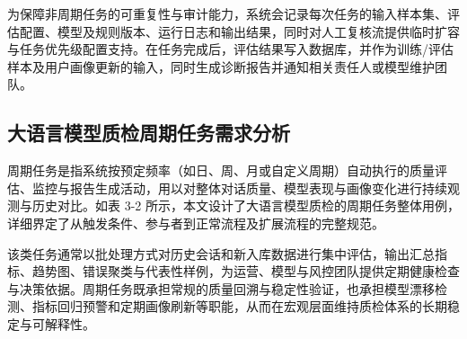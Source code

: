 为保障非周期任务的可重复性与审计能力，系统会记录每次任务的输入样本集、评估配置、模型及规则版本、运行日志和输出结果，同时对人工复核流提供临时扩容与任务优先级配置支持。在任务完成后，评估结果写入数据库，并作为训练/评估样本及用户画像更新的输入，同时生成诊断报告并通知相关责任人或模型维护团队。

\subsection{大语言模型质检周期任务需求分析}
周期任务是指系统按预定频率（如日、周、月或自定义周期）自动执行的质量评估、监控与报告生成活动，用以对整体对话质量、模型表现与画像变化进行持续观测与历史对比。如表 3-2 所示，本文设计了大语言模型质检的周期任务整体用例，详细界定了从触发条件、参与者到正常流程及扩展流程的完整规范。

该类任务通常以批处理方式对历史会话和新入库数据进行集中评估，输出汇总指标、趋势图、错误聚类与代表性样例，为运营、模型与风控团队提供定期健康检查与决策依据。周期任务既承担常规的质量回溯与稳定性验证，也承担模型漂移检测、指标回归预警和定期画像刷新等职能，从而在宏观层面维持质检体系的长期稳定与可解释性\cite{10.1145/2523813}。


